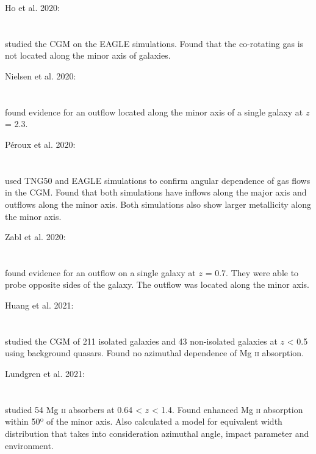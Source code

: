 \hline

Ho et al. 2020: \\
\citet{2020ApJ...904...76H} \\
\citep{2020ApJ...904...76H} \\
studied the CGM on the EAGLE simulations. Found that the co-rotating gas is not
located along the minor axis of galaxies. \\

\hline

Nielsen et al. 2020: \\
\citet{2020ApJ...904..164N} \\
\citep{2020ApJ...904..164N} \\
found evidence for an outflow located along the minor axis of a single galaxy at
$z$ = 2.3. \\

\hline

Péroux et al. 2020: \\
\citet{2020MNRAS.499.2462P} \\
\citep{2020MNRAS.499.2462P} \\
used TNG50 and EAGLE simulations to confirm angular dependence of gas flows in
the CGM. Found that both simulations have inflows along the major axis and
outflows along the minor axis. Both simulations also show larger metallicity
along the minor axis. \\

\hline

Zabl et al. 2020: \\
\citet{2020MNRAS.492.4576Z} \\
\citep{2020MNRAS.492.4576Z} \\
found evidence for an outflow on a single galaxy at $z$ = 0.7. They were able to
probe opposite sides of the galaxy. The outflow was located along the minor
axis. \\

\hline

Huang et al. 2021: \\
\citet{2021MNRAS.502.4743H} \\
\citep{2021MNRAS.502.4743H} \\
studied the CGM of 211 isolated galaxies and 43 non-isolated galaxies at
$z$ < 0.5 using background quasars. Found no azimuthal dependence of
Mg \textsc{ii} absorption. \\

\hline

Lundgren et al. 2021: \\
\citet{2021ApJ...913...50L} \\
\citep{2021ApJ...913...50L} \\
studied 54 Mg \textsc{ii} absorbers at 0.64 < $z$ < 1.4. Found enhanced
Mg \textsc{ii} absorption within 50º of the minor axis. Also calculated a model
for equivalent width distribution that takes into consideration azimuthal angle,
impact parameter and environment.
